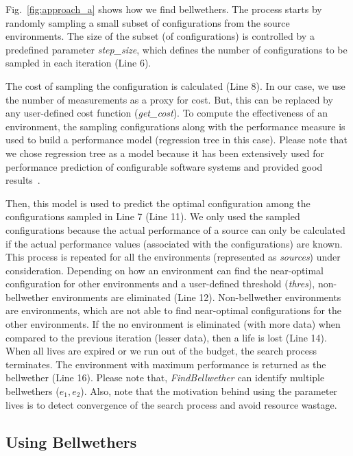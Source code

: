 \documentclass[10pt,journal,compsoc]{IEEEtran}
\begin{document}
Fig.~\ref{fig:approach_a} shows how we find  bellwethers. The process starts by randomly sampling a small subset of configurations from the source environments. The size of the subset (of configurations) is controlled by a predefined parameter \textit{step\_size}, which defines the number of configurations to be sampled in each iteration (Line 6). 

The cost of sampling the configuration is calculated (Line 8). In our case, we use the number of measurements as a proxy for cost. But, this can be replaced by any user-defined cost function (\textit{get\_cost}). To compute the effectiveness of an environment, the sampling configurations along with the performance measure is used to build a performance model (regression tree in this case). Please note that we chose regression tree as a model because it has been extensively used for performance prediction of configurable
software systems and provided good results~\cite{guo2013variability, sarkar2015cost, nair2017faster, nair2017using, nair2018finding, guo2017data, valov2017transferring}. 

Then, this model is used to predict the optimal configuration among the configurations sampled in Line 7 (Line 11). We only used the sampled configurations because the actual performance of a source can only be calculated if the actual performance values (associated with the configurations) are known. This process is repeated for all the environments (represented as \textit{sources}) under consideration. Depending on how an environment can find the near-optimal configuration for other environments and a user-defined threshold (\textit{thres}), non-bellwether environments are eliminated (Line 12). Non-bellwether environments are environments, which are not able to find near-optimal configurations for the other environments.  If the no environment is eliminated (with more
data) when compared to the previous iteration
(lesser data), then a life is lost (Line 14). When all lives are
expired or we run out of the budget, the search process terminates. The environment with maximum performance is returned as the bellwether (Line 16). Please note that, \textit{FindBellwether} can identify multiple bellwethers ($e_1, e_2$). Also, note that the motivation behind using the parameter lives is to detect
convergence of the search process and avoid resource wastage.



\vspace{-0.2cm}
\subsection{Using Bellwethers}
\end{document}
